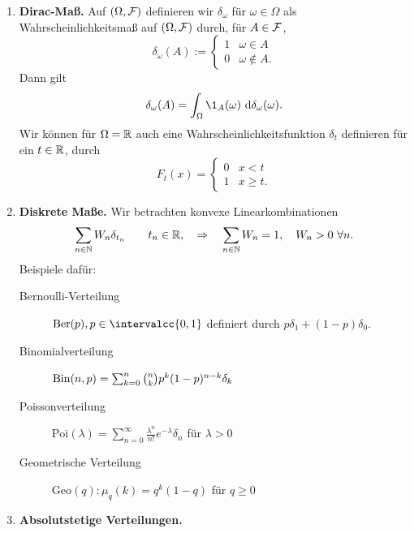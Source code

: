 \documentclass[language=ngerman]{../../Template/TemplateLecture}
\begin{document}
\begin{enumerate}[$(1)$]
    \item \textbf{Dirac-Maß.} Auf $(\Omega, \mathcal{F})$ definieren wir $\delta_\omega$ für $\omega \in \Omega$ als Wahrscheinlichkeitsmaß auf $(\Omega, \mathcal{F})$ durch, für $A \in \mathcal{F}$,
    \begin{equation}
        \delta_\omega(A) := \begin{cases}
            1 & \omega \in A \\ 0 & \omega \notin A.
        \end{cases}
    \end{equation}
    Dann gilt 
    \begin{equation}
        \delta_\omega(A) = \int_\Omega \1_A(\omega) \dd\delta_\omega(\omega).
    \end{equation}
    Wir können für $\Omega = \mathbb{R}$ auch eine Wahrscheinlichkeitsfunktion $\delta_t$ definieren für ein $t \in \mathbb{R}$, durch 
    \begin{equation}
        F_t(x) = \begin{cases}
            0 & x < t \\ 1 & x \geq t.
        \end{cases}
    \end{equation}
    \item \textbf{Diskrete Maße.} Wir betrachten konvexe Linearkombinationen 
    \begin{equation}
        \sum_{n \in \mathbb{N} } W_n \delta_{t_n} \quad \quad t_n \in \mathbb{R}, \quad \Rightarrow \quad \sum_{n \in \mathbb{N}} W_n = 1, \quad W_n > 0 ~\forall n.
    \end{equation}
    Beispiele dafür:
    \begin{description}
        \item[Bernoulli-Verteilung] $\mathrm{Ber}(p), p \in \intervalcc{0,1}$ definiert durch $p\delta_1 + (1-p)\delta_0$.
        \item[Binomialverteilung] $\operatorname{Bin}(n,p) = \sum_{k = 0}^n \binom{n}{k} p^k (1-p)^{n-k} \delta_k$
        \item[Poissonverteilung] $\mathrm{Poi}(\lambda) = \sum_{n = 0}^\infty \frac{\lambda^n}{n!}e^{-\lambda}\delta_n$ für $\lambda > 0$
        \item[Geometrische Verteilung] $\mathrm{Geo}(q): \mu_q(k) = q^k(1-q)$ für $q \geq 0$    
    \end{description}
    \item \textbf{Absolutstetige Verteilungen.}
    \begin{description}

\end{description}
\end{enumerate}
\end{document}

